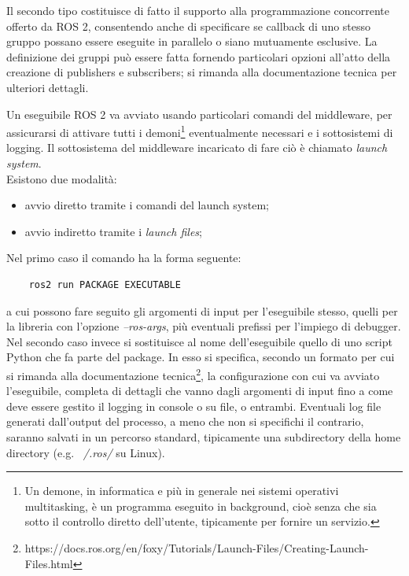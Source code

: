 Il secondo tipo costituisce di fatto il supporto alla programmazione concorrente offerto da ROS 2, consentendo anche di specificare se callback di uno stesso gruppo possano essere eseguite in parallelo o siano mutuamente esclusive. La definizione dei gruppi può essere fatta fornendo particolari opzioni all'atto della creazione di publishers e subscribers; si rimanda alla documentazione tecnica per ulteriori dettagli.

\indent Un eseguibile ROS 2 va avviato usando particolari comandi del middleware, per assicurarsi di attivare tutti i demoni\footnote{Un demone, in informatica e più in generale nei sistemi operativi multitasking, è un programma eseguito in background, cioè senza che sia sotto il controllo diretto dell'utente, tipicamente per fornire un servizio.} eventualmente necessari e i sottosistemi di logging. Il sottosistema del middleware incaricato di fare ciò è chiamato \emph{launch system}.\\
Esistono due modalità:
\begin{itemize}
    \item avvio diretto tramite i comandi del launch system;
    \item avvio indiretto tramite i \emph{launch files};
\end{itemize}
Nel primo caso il comando ha la forma seguente:
\begin{verbatim}
    ros2 run PACKAGE EXECUTABLE
\end{verbatim}
a cui possono fare seguito gli argomenti di input per l'eseguibile stesso, quelli per la libreria con l'opzione \emph{--ros-args}, più eventuali prefissi per l'impiego di debugger.\\
Nel secondo caso invece si sostituisce al nome dell'eseguibile quello di uno script Python che fa parte del package. In esso si specifica, secondo un formato per cui si rimanda alla documentazione tecnica\footnote{https://docs.ros.org/en/foxy/Tutorials/Launch-Files/Creating-Launch-Files.html}, la configurazione con cui va avviato l'eseguibile, completa di dettagli che vanno dagli argomenti di input fino a come deve essere gestito il logging in console o su file, o entrambi. Eventuali log file generati dall'output del processo, a meno che non si specifichi il contrario, saranno salvati in un percorso standard, tipicamente una subdirectory della home directory (e.g. \emph{~/.ros/} su Linux).

